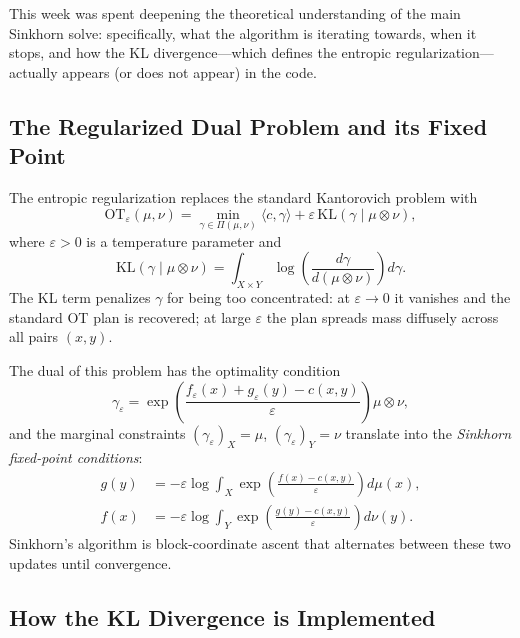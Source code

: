 \documentclass{article}
\begin{document}
This week was spent deepening the theoretical understanding of the main Sinkhorn solve: specifically, what the algorithm is iterating towards, when it stops, and how the KL divergence---which defines the entropic regularization---actually appears (or does not appear) in the code.

\subsection{The Regularized Dual Problem and its Fixed Point}

The entropic regularization replaces the standard Kantorovich problem with
\begin{equation}
    \mathrm{OT}_\varepsilon(\mu, \nu)
    = \min_{\gamma \in \Pi(\mu,\nu)} \langle c, \gamma \rangle
    + \varepsilon \,\mathrm{KL}(\gamma \mid \mu \otimes \nu),
\end{equation}
where $\varepsilon > 0$ is a temperature parameter and
\begin{equation}
    \mathrm{KL}(\gamma \mid \mu \otimes \nu)
    = \int_{X \times Y} \log\!\left(\frac{d\gamma}{d(\mu \otimes \nu)}\right) d\gamma.
\end{equation}
The KL term penalizes $\gamma$ for being too concentrated: at $\varepsilon \to 0$ it vanishes and the standard OT plan is recovered; at large $\varepsilon$ the plan spreads mass diffusely across all pairs $(x, y)$.

The dual of this problem has the optimality condition
\begin{equation}
    \gamma_\varepsilon = \exp\!\left(\frac{f_\varepsilon(x) + g_\varepsilon(y) - c(x,y)}{\varepsilon}\right) \mu \otimes \nu,
\end{equation}
and the marginal constraints $(\gamma_\varepsilon)_X = \mu$, $(\gamma_\varepsilon)_Y = \nu$ translate into the \emph{Sinkhorn fixed-point conditions}:
\begin{align}
    g(y) &= -\varepsilon \log \int_X \exp\!\left(\frac{f(x) - c(x,y)}{\varepsilon}\right) d\mu(x), \label{eq:g_update} \\
    f(x) &= -\varepsilon \log \int_Y \exp\!\left(\frac{g(y) - c(x,y)}{\varepsilon}\right) d\nu(y). \label{eq:f_update}
\end{align}
Sinkhorn's algorithm is block-coordinate ascent that alternates between these two updates until convergence.

\subsection{How the KL Divergence is Implemented}
\end{document}
